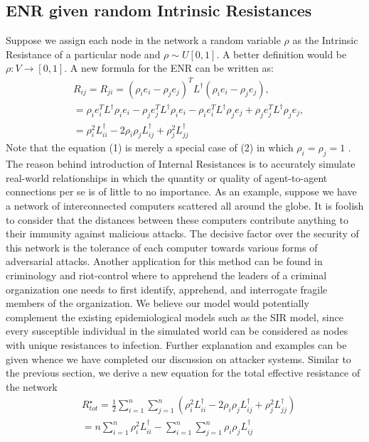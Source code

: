 \documentclass{article}
\begin{document}
	\subsection{ENR given random Intrinsic Resistances}
	Suppose we assign each node in the network a random variable $\rho$ as the Intrinsic Resistance of a particular node and $\rho \sim U[0,1]$. A better definition would be $\rho: V \rightarrow \left[ 0,1 \right]$. A new formula for the ENR can be written as:
	\begin{equation}
	\begin{aligned}
		&R_{ij} = R_{ji} = (\rho_i e_i - \rho_j e_j)^T L^{\dag} (\rho_i e_i - \rho_j e_j), \\
		&=\rho_i e_i^{T}L^{\dag}\rho_i e_i -\rho_j e_j^{T}L^{\dag}\rho_i e_i - \rho_i e_i^{T}L^{\dag}\rho_j e_j + \rho_j e_j^{T}L^{\dag}\rho_j e_j , \\
		&= \rho_i^{2} L_{ii}^{\dag} - 2\rho_i \rho_j L_{ij}^{\dag} + \rho_j^{2} L_{jj}^{\dag}
	\end{aligned}
	\end{equation}
	Note that the equation (1) is merely a special case of (2) in which $\rho_i = \rho_j = 1$ . The reason behind introduction of Internal Resistances is to accurately simulate real-world relationships in which the quantity or quality of agent-to-agent connections per se is of little to no importance. As an example, suppose we have a network of interconnected computers scattered all around the globe. It is foolish to consider that the distances between these computers contribute anything to their immunity against malicious attacks. The decisive factor over the security of this network is the tolerance of each computer towards various forms of adversarial attacks. Another application for this method can be found in criminology and riot-control where to apprehend the leaders of a criminal organization one needs to first identify, apprehend, and interrogate fragile members of the organization. We believe our model would potentially complement the existing epidemiological models such as the SIR model, since every susceptible individual in the simulated world can be considered as nodes with unique resistances to infection. Further explanation and examples can be given whence we have completed our discussion on attacker systems. Similar to the previous section, we derive a new equation for the total effective resistance of the network
	\begin{equation}
		\begin{aligned}
			&R_{tot}^{\star}=\frac{1}{2}\sum_{i=1}^{n}\sum_{j=1}^{n} \left(\rho_i^{2} L_{ii}^{\dag} - 2\rho_i \rho_j L_{ij}^{\dag} + \rho_j^{2} L_{jj}^{\dag} \right) \\
			&= n\sum_{i=1}^{n} \rho_i^{2}L_{ii}^{\dag} - \sum_{i=1}^{n}\sum_{j=1}^{n} \rho_i\rho_j L_{ij}^{\dag}
		\end{aligned}
	\end{equation} 
\end{document}
